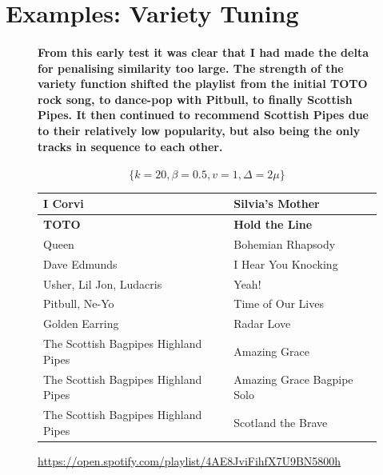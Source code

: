 \documentclass[a4paper, 12pt]{report}
\begin{document}
\section{Examples: Variety Tuning}
\begin{figure}[H]
    \paragraph{From this early test it was clear that I had made the delta for penalising similarity too large. The strength of the variety function shifted the playlist
from the initial TOTO rock song, to dance-pop with Pitbull, to finally Scottish Pipes. It then continued to recommend Scottish Pipes due to their relatively low popularity,
but also being the only tracks in sequence to each other.}
\[\{k = 20, \beta = 0.5, v = 1, \Delta = 2\mu\}\]
    \begin{center}
        \begin{tabulary}{\linewidth}{|@{\makebox[2em][c]{\rownumber}}|L|L|} 
            \hline
            I Corvi & Silvia's Mother \\ 
            \hline
            \textbf{TOTO} & \textbf{Hold the Line} \\
            \hline
            Queen & Bohemian Rhapsody \\
            \hline
            Dave Edmunds & I Hear You Knocking \\
            \hline
            Usher, Lil Jon, Ludacris & Yeah! \\
            \hline
            Pitbull, Ne-Yo & Time of Our Lives \\
            \hline
            Golden Earring & Radar Love \\
            \hline
            The Scottish Bagpipes Highland Pipes & Amazing Grace \\
            \hline
            The Scottish Bagpipes Highland Pipes & Amazing Grace Bagpipe Solo \\
            \hline
            The Scottish Bagpipes Highland Pipes & Scotland the Brave \\
            \hline
        \end{tabulary}
    \caption{\url{https://open.spotify.com/playlist/4AE8JviFihfX7U9BN5800h}}
    \end{center}
\end{figure}
\end{document}
